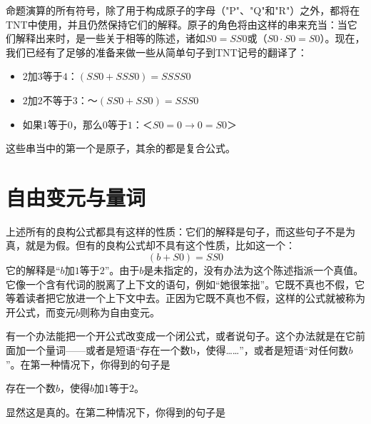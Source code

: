 命题演算的所有符号，除了用于构成原子的字母（"P"、"Q"和"R"）之外，都将在TNT中使用，并且仍然保持它们的解释。原子的角色将由这样的串来充当：当它们解释出来时，是一些关于相等的陈述，诸如$S0=SS0$或（$S0\cdot S0=S0$）。现在，我们已经有了足够的准备来做一些从简单句子到TNT记号的翻译了：
\begin{itemize}
\item $2$加$3$等于$4$：$(SS0+SSS0)=SSSS0$
\item $2$加$2$不等于$3$：$～(SS0+SS0)=SSS0$
\item 如果$1$等于$0$，那么$0$等于$1$：$＜S0=0→0=S0＞$
\end{itemize}
这些串当中的第一个是原子，其余的都是复合公式。

\section{自由变元与量词}

上述所有的良构公式都具有这样的性质：它们的解释是句子，而这些句子不是为真，就是为假。但有的良构公式却不具有这个性质，比如这一个：
\[
(b+S0)=SS0
\]
它的解释是“$b$加$1$等于$2$”。由于$b$是未指定的，没有办法为这个陈述指派一个真值。它像一个含有代词的脱离了上下文的语句，例如“她很笨拙”。它既不真也不假，它等着读者把它放进一个上下文中去。正因为它既不真也不假，这样的公式就被称为开公式，而变元$b$则称为自由变元。

有一个办法能把一个开公式改变成一个闭公式，或者说句子。这个办法就是在它前面加一个量词——或者是短语“存在一个数b，使得……”，或者是短语“对任何数$b$”。在第一种情况下，你得到的句子是

\begin{block}
存在一个数$b$，使得$b$加$1$等于$2$。
\end{block}
显然这是真的。在第二种情况下，你得到的句子是

